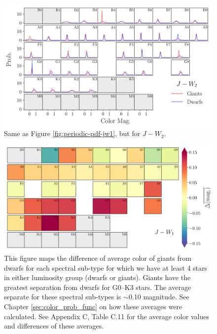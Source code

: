 \begin{figure}
    \centering
    \includegraphics[width=1.0\textwidth,clip=true]{Figures/periodic/t-pdf_J_W2-periodic.png}
    \caption{Same as Figure \ref{fig:periodic-pdf-jw1}, but for $J-W_{2}$.}
    \label{fig:periodic-pdf-jw2}
\end{figure}
\clearpage
\begin{figure}
    \centering
    \includegraphics[width=1.0\textwidth,clip=true]{Figures/periodic/periodic-delta_J_W1.png}
    \caption{This figure maps the difference of average color of giants from dwarfs for each spectral sub-type for which we have at least 4 stars in either luminosity group (dwarfs or giants). Giants have the greatest separation from dwarfs for G0--K3 stars. The average separate for these spectral sub-types is $\sim$0.10 magnitude. See Chapter \ref{sec:color_prob_func} on how these averages were calculated. See Appendix C, Table C.11 for the average color values and differences of these averages.}
    \label{fig:periodic-delta-jw1}
\end{figure}

